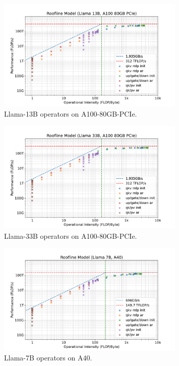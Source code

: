 \documentclass{article}
\theoremstyle{plain}
\theoremstyle{definition}
\theoremstyle{remark}
\begin{document}
\begin{figure}[h]
    \centering
    \includegraphics[width=0.8\textwidth]{llama13b-roofline-a100.pdf}
    \caption{Llama-13B operators on A100-80GB-PCIe.}
    \label{fig:llama13b-roofline-a100}
\end{figure}

\begin{figure}[h]
    \centering
    \includegraphics[width=0.8\textwidth]{llama33b-roofline-a100.pdf}
    \caption{Llama-33B operators on A100-80GB-PCIe.}
    \label{fig:llama33b-roofline-a100}
\end{figure}

\begin{figure}[h]
    \centering
    \includegraphics[width=0.8\textwidth]{llama7b-roofline-a40.pdf}
    \caption{Llama-7B operators on A40.}
    \label{fig:llama7b-roofline-a40}
\end{figure}
\end{document}
